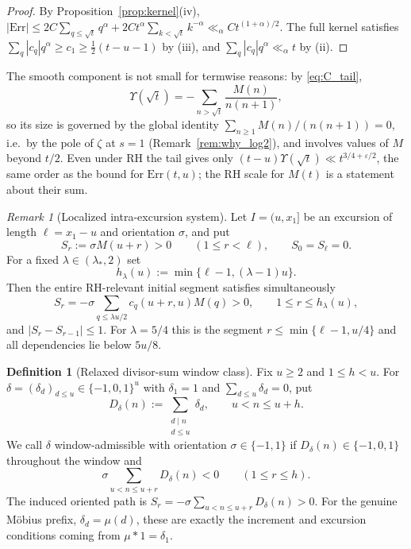 \documentclass[11pt]{amsart}
\numberwithin{equation}{section}
\theoremstyle{plain}
\theoremstyle{definition}
\newtheorem{definition}[theorem]{Definition}
\theoremstyle{remark}
\newtheorem{remark}[theorem]{Remark}
\newcommand{\eps}{\varepsilon}
\begin{document}
\begin{proof}
By Proposition~\ref{prop:kernel}(iv),
$|\mathrm{Err}|\le2C\sum_{q\le\sqrt t}q^\alpha+2Ct^\alpha\sum_{k<\sqrt t}k^{-\alpha}
\ll_\alpha Ct^{(1+\alpha)/2}$. The full kernel satisfies
$\sum_q|c_q|q^\alpha\ge c_1\ge\frac12(t-u-1)$ by (iii), and
$\sum_q|c_q|q^\alpha\ll_\alpha t$ by (ii).
\end{proof}

The smooth component is not small for termwise reasons: by
\eqref{eq:C_tail},
\[
\Upsilon(\sqrt t)=-\sum_{n>\sqrt t}\frac{M(n)}{n(n+1)},
\]
so its size is governed by the global identity
$\sum_{n\ge1}M(n)/(n(n+1))=0$, i.e.\ by the pole of $\zeta$ at $s=1$
(Remark~\ref{rem:why_log2}), and involves values of $M$ beyond $t/2$. Even
under RH the tail gives only $(t-u)\Upsilon(\sqrt t)\ll t^{3/4+\eps/2}$, the
same order as the bound for $\mathrm{Err}(t,u)$; the RH scale for $M(t)$ is a statement
about their sum.

\begin{remark}[Localized intra-excursion system]
\label{rem:sign-cone}
Let $I=(u,x_1]$ be an excursion of length $\ell=x_1-u$ and orientation
$\sigma$, and put
\[
S_r:=\sigma M(u+r)>0\qquad(1\le r<\ell),\qquad S_0=S_\ell=0.
\]
For a fixed $\lambda\in(\lambda_*,2)$ set
\[
h_\lambda(u):=\min\{\ell-1,(\lambda-1)u\}.
\]
Then the entire RH-relevant initial segment satisfies simultaneously
\[
S_r=-\sigma\sum_{q\le\lambda u/2}c_q(u+r,u)M(q)>0,
\qquad1\le r\le h_\lambda(u),
\]
and $|S_r-S_{r-1}|\le1$.  For $\lambda=5/4$ this is the segment
$r\le\min\{\ell-1,u/4\}$ and all dependencies lie below $5u/8$.
\end{remark}

\begin{definition}[Relaxed divisor-sum window class]
\label{def:relaxed-divisor-cone}
Fix $u\ge2$ and $1\le h<u$.  For
$\delta=(\delta_d)_{d\le u}\in\{-1,0,1\}^u$ with $\delta_1=1$ and
$\sum_{d\le u}\delta_d=0$, put
\[
D_\delta(n):=\sum_{\substack{d\mid n\\ d\le u}}\delta_d,
\qquad u<n\le u+h.
\]
We call $\delta$ window-admissible with orientation $\sigma\in\{-1,1\}$ if
$D_\delta(n)\in\{-1,0,1\}$ throughout the window and
\[
\sigma\sum_{u<n\le u+r}D_\delta(n)<0
\qquad(1\le r\le h).
\]
The induced oriented path is
$S_r=-\sigma\sum_{u<n\le u+r}D_\delta(n)>0$.
For the genuine M\"obius prefix, $\delta_d=\mu(d)$, these are exactly the
increment and excursion conditions coming from $\mu*1=\delta_1$.
\end{definition}
\end{document}
